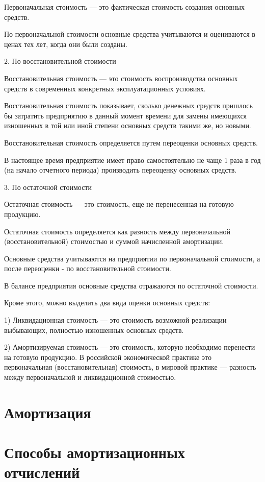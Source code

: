 Первоначальная стоимость --- это фактическая стоимость создания основных средств.

По первоначальной стоимости основные средства учитываются и оцениваются в ценах
тех лет, когда они были созданы.

2. По восстановительной стоимости

Восстановительная стоимость --- это стоимость воспроизводства основных средств в
современных конкретных эксплуатационных условиях.

Восстановительная стоимость показывает, сколько денежных средств пришлось бы
затратить предприятию в данный момент времени для замены имеющихся изношенных в
той или иной степени основных средств такими же, но новыми.

Восстановительная стоимость определяется путем переоценки основных средств.

В настоящее время предприятие имеет право самостоятельно не чаще 1 раза в год
(на начало отчетного периода) производить переоценку основных средств.

3. По остаточной стоимости

Остаточная стоимость --- это стоимость, еще не перенесенная на готовую
продукцию.

Остаточная стоимость определяется как разность между первоначальной
(восстановительной) стоимостью и суммой начисленной амортизации.

Основные средства учитываются на предприятии по первоначальной стоимости, а
после переоценки - по восстановительной стоимости.

В балансе предприятия основные средства отражаются по остаточной стоимости.

Кроме этого, можно выделить два вида оценки основных средств:

1) Ликвидационная стоимость --- это стоимость возможной реализации выбывающих,
полностью изношенных основных средств.

2) Амортизируемая стоимость --- это стоимость, которую необходимо перенести на
готовую продукцию. В российской экономической практике это первоначальная
(восстановительная) стоимость, в мировой практике --- разность между
первоначальной и ликвидационной стоимостью.

\section{Амортизация}

\section{Способы амортизационных отчислений}
